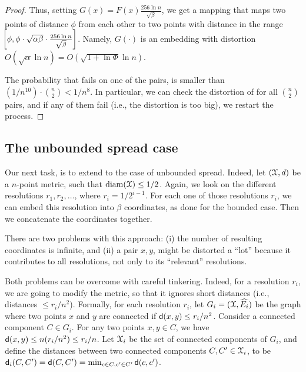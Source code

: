 \begin{proof}
    Thus, setting $G(x) = F(x) \frac{256 \ln n}{\sqrt{\beta}}$, we get
    a mapping that maps two points of distance $\phi$ from each other
    to two points with distance in the range $\!\!\left[ {\phi , \phi \cdot
       \sqrt{\alpha \beta} \cdot \frac{256 \ln n}{\sqrt{\beta}} 
    } \bigr. \right]$. Namely, $G(\cdot)$ is an embedding with distortion $O(
    \sqrt{\alpha} \ln n) = O(\sqrt{1+\ln\Phi}\ln n)$.

    The probability that  fails on one of the pairs, is
    smaller than $(1/n^{10}) \cdot \binom{n}{2} < 1/n^{8}$. In
    particular, we can check the distortion of  for all
    $\binom{n}{2}$ pairs, and if any of them fail (i.e., the
    distortion is too big), we restart the process.
\end{proof}



\subsection{The unbounded spread case}

Our next task, is to extend  to the case
of unbounded spread. Indeed, let $(\FMS,d)$ be a $n$-point metric, such
that $\diam(\FMS) \leq 1/2$. Again, we look on the different resolutions
$r_1, r_2, \ldots$, where $r_i = 1/2^{i-1}$. For each one of those
resolutions $r_i$, we can embed this resolution into $\beta$
coordinates, as done for the bounded case. Then we concatenate the
coordinates together.

There are two problems with this approach: (i) the number of resulting
coordinates is infinite, and (ii) a pair $x,y$, might be distorted a
``lot'' because it contributes to all resolutions, not only to its
``relevant'' resolutions.

Both problems can be overcome with careful tinkering. Indeed, for a
resolution $r_i$, we are going to modify the metric, so that it
ignores short distances (i.e., distances $\leq r_i/n^2$).  Formally,
for each resolution $r_i$, let $G_i =(\FMS,\widehat{E_i})$ be the
graph where two points $x$ and $y$ are connected if $\mathsf{d}(x,y) \leq
r_i/n^2$.  Consider a connected component $C \in G_i$. For any two
points $x, y \in C$, we have $\mathsf{d}(x,y) \leq n( r_i/n^2 ) \leq
r_i/n$. Let $\FMS_i$ be the set of connected components of $G_i$, and
define the distances between two connected components $C, C' \in
\FMS_i$, to be $\mathsf{d}_i(C, C') = \mathsf{d}(C, C') = \min_{c \in C, c' \in
   C'} \mathsf{d}(c, c')$.

